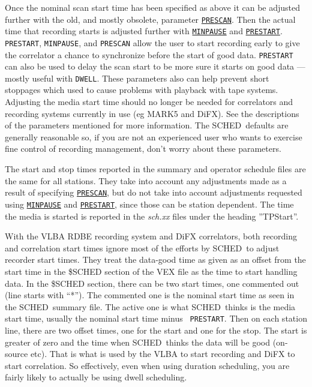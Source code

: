 \documentclass{report}
\newcommand{\schedb}{{\sc SCHED~}}
\begin{document}
Once the nominal scan start time has been specified as above it can be
adjusted further with the old, and mostly obsolete, parameter
{\hyperref[MP:PRESCAN]{{\tt PRESCAN}}}.  Then the actual time that
recording starts is adjusted further with 
{\hyperref[MP:MINPAUSE]{{\tt MINPAUSE}}} and 
{\hyperref[MP:PRESTART]{{\tt PRESTART}}}.
{\tt PRESTART}, {\tt MINPAUSE}, and {\tt PRESCAN} allow the user to
start recording early to give the correlator a chance to synchronize
before the start of good data.  {\tt PRESTART} can also be used to
delay the scan start to be more sure it starts on good data --- mostly
useful with {\tt DWELL}.  These parameters also can help prevent short
stoppages which used to cause problems with playback with tape
systems.  Adjusting the media start time should no longer be needed
for correlators and recording systems currently in use (eg MARK5 and
DiFX).  See the descriptions of the parameters mentioned for more
information.  The \schedb defaults are generally reasonable so, if you
are not an experienced user who wants to exercise fine control of
recording management, don't worry about these parameters.

The start and stop times reported in the summary and operator schedule
files are the same for all stations.  They take into account any
adjustments made as a result of specifying 
{\hyperref[MP:PRESCAN]{{\tt PRESCAN}}},
but do not take into account adjustments requested using
{\hyperref[MP:MINPAUSE]{{\tt MINPAUSE}}} and 
{\hyperref[MP:PRESTART]{{\tt PRESTART}}},
since those can be station dependent.  The
time the media is started is reported in the {\sl sch.xx} files
under the heading ''TPStart''.

With the VLBA RDBE recording system and DiFX correlators, both
recording and correlation start times ignore most of the efforts by
\schedb to adjust recorder start times.  They treat the data-good time
as given as an offset from the start time in the \$SCHED section of
the VEX file as the time to start handling data.  In the \$SCHED
section, there can be two start times, one commented out (line starts
with ``*'').  The commented one is the nominal start time as seen in
the \schedb summary file.  The active one is what \schedb thinks is
the media start time, usually the nominal start time minus {\tt
PRESTART}.  Then on each station line, there are two offset times, one
for the start and one for the stop.  The start is greater of zero and
the time when \schedb thinks the data will be good (on-source etc).
That is what is used by the VLBA to start recording and DiFX to start
correlation.  So effectively, even when using duration scheduling, you
are fairly likely to actually be using dwell scheduling.
\end{document}

